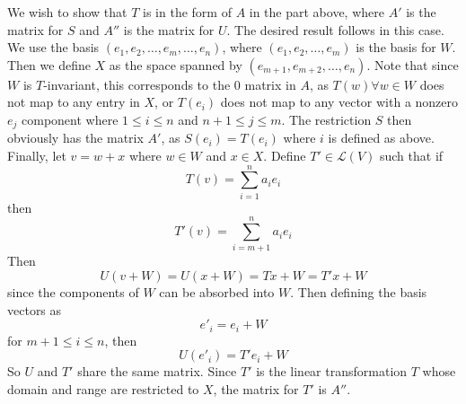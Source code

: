 \documentclass[answers]{exam}
\begin{document}
\begin{questions}
\begin{parts}
\begin{solution}
	We wish to show that $T$ is in the form of $A$ in the part above, where $A'$ is the matrix for $S$ and $A''$ is the matrix for $U$. The desired result follows in this case.
	We use the basis $(e_1, e_2, \dots, e_m, \dots, e_n)$, where $(e_1,e_2,\dots,e_m)$ is the basis for $W$. Then we define $X$ as the space spanned by $(e_{m+1},e_{m+2},\dots,e_n)$. Note that since $W$ is $T$-invariant, this corresponds to the 0 matrix in $A$, as $T(w)\forall w\in W$ does not map to any entry in $X$, or $T(e_i)$ does not map to any vector with a nonzero $e_j$ component where $1\leq i\leq n$ and $n+1\leq j\leq m$. The restriction $S$ then obviously has the matrix $A'$, as $S(e_i) = T(e_i)$ where $i$ is defined as above. Finally, let $v=w+x$ where $w\in W$ and $x\in X$. Define $T'\in\mathcal{L}(V)$ such that if
	$$T(v) = \sum_{i=1}^n a_ie_i$$
	then
	$$T'(v) = \sum_{i=m+1}^n a_ie_i$$
	Then
	$$U(v+W) = U(x+W) = Tx+W = T'x+W$$
	since the components of $W$ can be absorbed into $W$. Then defining the basis vectors as
	$$e'_i = e_i+W$$
	for $m+1\leq i\leq n$, then
	$$U(e'_i) = T'e_i+W$$
	So $U$ and $T'$ share the same matrix. Since $T'$ is the linear transformation $T$ whose domain and range are restricted to $X$, the matrix for $T'$ is $A''$.
\end{solution}

\end{parts}

\end{questions}
\end{document}
